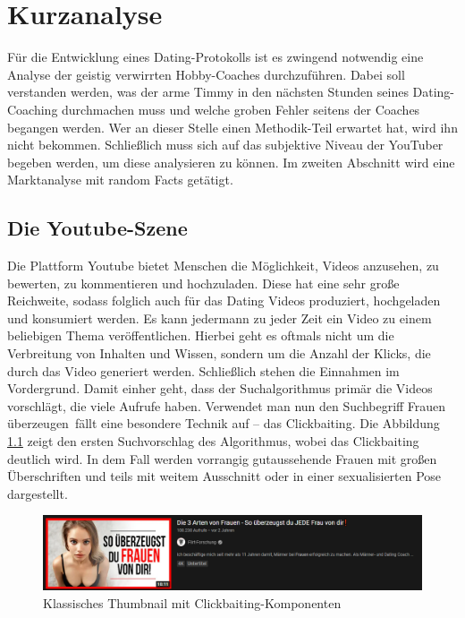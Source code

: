 \chapter{Kurzanalyse}
\label{chapter-analyse}

Für die Entwicklung eines Dating-Protokolls ist es zwingend notwendig eine Analyse der geistig verwirrten Hobby-Coaches durchzuführen.
Dabei soll verstanden werden, was der arme Timmy in den nächsten Stunden seines Dating-Coaching durchmachen muss und welche groben Fehler seitens der Coaches begangen werden.
Wer an dieser Stelle einen Methodik-Teil erwartet hat, wird ihn nicht bekommen.
Schließlich muss sich auf das subjektive Niveau der YouTuber begeben werden, um diese analysieren zu können.
Im zweiten Abschnitt wird eine Marktanalyse mit random Facts getätigt.

\section{Die Youtube-Szene}
\label{chapter-analyse-yt}

Die Plattform Youtube bietet Menschen die Möglichkeit, Videos anzusehen, zu bewerten, zu kommentieren und hochzuladen. 
Diese hat eine sehr große Reichweite, sodass folglich auch für das Dating Videos produziert, hochgeladen und konsumiert werden.
Es kann jedermann zu jeder Zeit ein Video zu einem beliebigen Thema veröffentlichen.
Hierbei geht es oftmals nicht um die Verbreitung von Inhalten und Wissen, sondern um die Anzahl der Klicks, die durch das Video generiert werden.
Schließlich stehen die Einnahmen im Vordergrund.
Damit einher geht, dass der Suchalgorithmus primär die Videos vorschlägt, die viele Aufrufe haben.
Verwendet man nun den Suchbegriff \glqq Frauen überzeugen\grqq~fällt eine besondere Technik auf – das Clickbaiting.
Die Abbildung \ref{fig:analyse-clickbait} zeigt den ersten Suchvorschlag des Algorithmus, wobei das Clickbaiting deutlich wird.
In dem Fall werden vorrangig gutaussehende Frauen mit großen Überschriften und teils mit weitem Ausschnitt oder in einer sexualisierten Pose dargestellt. 

\begin{figure}[h]
    \centering
    \includegraphics[scale=0.4]{Sources/clickbait.png}
    \caption{Klassisches Thumbnail mit Clickbaiting-Komponenten \cite{royalflushseduction}}
    \label{fig:analyse-clickbait}
\end{figure}

